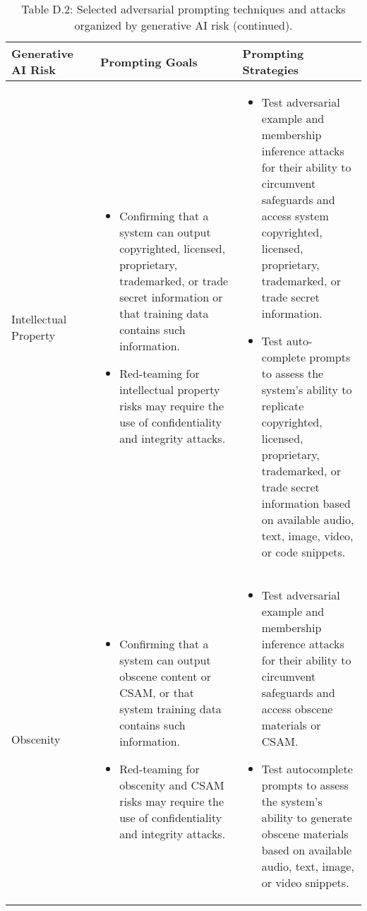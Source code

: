 \documentclass[fleqn]{article}
\begin{document}
\begin{table}[H]
	\caption*{Table D.2: Selected adversarial prompting techniques and attacks organized by generative AI risk (continued).}
	\label{tab:rt_by_gai_risk_cont3}
	\scriptsize
	\begin{tabular}{|m{0.25\linewidth} |m{0.40\linewidth} | m{0.35\linewidth} |}			
		\hline
		\textbf{Generative AI Risk} &  \textbf{Prompting Goals} & \textbf{Prompting Strategies} \\
		\hline	
		Intellectual Property  &
		\begin{itemize}[noitemsep, leftmargin=*] 
			\item Confirming that a system can output copyrighted, licensed,  proprietary, trademarked, or trade secret information or that training data contains such information. 
			\item Red-teaming for intellectual property risks may require the use of confidentiality and integrity attacks.
		\end{itemize} 
		& 
		\begin{itemize}[noitemsep, leftmargin=*] 
			\item Test adversarial example and membership inference attacks for their ability to circumvent safeguards and access system copyrighted, licensed,  proprietary, trademarked, or trade secret information.
			\item Test auto-complete prompts to assess the system's ability to replicate copyrighted, licensed,  proprietary, trademarked, or trade secret information based on available audio, text, image, video, or code snippets.
		\end{itemize} \\
		\hline
		Obscenity  &
		\begin{itemize}[noitemsep, leftmargin=*] 
			\item Confirming that a system can output obscene content or CSAM, or that system training data contains such information.
			\item Red-teaming for obscenity and CSAM risks may require the use of confidentiality and integrity attacks.
		\end{itemize} 
		& 
		\begin{itemize}[noitemsep, leftmargin=*] 
			\item Test adversarial example and membership inference attacks for their ability to circumvent safeguards and access obscene materials or CSAM.			
			\item Test autocomplete prompts to assess the system's ability to generate obscene materials based on available audio, text, image, or video snippets.

\end{itemize}
\end{tabular}
\end{table}
\end{document}
